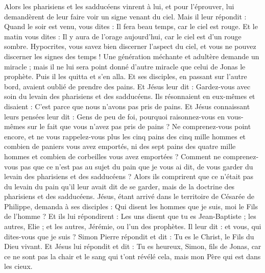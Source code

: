 \begin{multicols}{2}
\VerseOne{}Alors les pharisiens et les sadducéens vinrent à lui, et pour l'éprouver, lui demandèrent de leur faire voir un signe venant du ciel.
Mais il leur répondit : Quand le soir est venu, vous dites : Il fera beau temps, car le ciel est rouge.
Et le matin vous dites : Il y aura de l'orage aujourd'hui, car le ciel est d'un rouge sombre. Hypocrites, vous savez bien discerner l'aspect du ciel, et vous ne pouvez discerner les signes des temps !
Une génération méchante et adultère demande un miracle ; mais il ne lui sera point donné d'autre miracle que celui de Jonas le prophète. Puis il les quitta et s'en alla.
Et ses disciples, en passant sur l'autre bord, avaient oublié de prendre des pains.
Et Jésus leur dit : Gardez-vous avec soin du levain des pharisiens et des sadducéens.
Ils résonnaient en eux-mêmes et disaient : C'est parce que nous n'avons pas pris de pains.
Et Jésus connaissant leurs pensées leur dit : Gens de peu de foi, pourquoi raisonnez-vous en vous-mêmes sur le fait que vous n'avez pas pris de pains ?
Ne comprenez-vous point encore, et ne vous rappelez-vous plus les cinq pains des cinq mille hommes et combien de paniers vous avez emportés,
ni des sept pains des quatre mille hommes et combien de corbeilles vous avez emportées ?
Comment ne comprenez-vous pas que ce n'est pas au sujet du pain que je vous ai dit, de vous garder du levain des pharisiens et des sadducéens ?
Alors ils comprirent que ce n'était pas du levain du pain qu'il leur avait dit de se garder, mais de la doctrine des pharisiens et des sadducéens.
Jésus, étant arrivé dans le territoire de Césarée de Philippe, demanda à ses disciples : Qui disent les hommes que je suis, moi le Fils de l'homme ?
Et ils lui répondirent : Les uns disent que tu es Jean-Baptiste ; les autres, Elie ; et les autres, Jérémie, ou l'un des prophètes.
Il leur dit : et vous, qui dites-vous que je suis ?
Simon Pierre répondit et dit : Tu es le Christ, le Fils du Dieu vivant.
Et Jésus lui répondit et dit : Tu es heureux, Simon, fils de Jonas, car ce ne sont pas la chair et le sang qui t'ont révélé cela, mais mon Père qui est dans les cieux.

\end{multicols}
